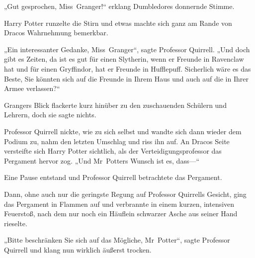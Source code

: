 „Gut gesprochen, Miss~Granger!“ erklang Dumbledores donnernde Stimme.

Harry Potter runzelte die Stirn und etwas machte sich ganz am Rande von Dracos Wahrnehmung bemerkbar.

„Ein interessanter Gedanke, Miss~Granger“, sagte Professor Quirrell. „Und doch gibt es Zeiten, da ist es gut für einen Slytherin, wenn er Freunde in Ravenclaw hat und für einen Gryffindor, hat er Freunde in Hufflepuff. Sicherlich wäre es das Beste, Sie könnten sich auf die Freunde in Ihrem Haus und auch auf die in Ihrer Armee verlassen?“

Grangers Blick flackerte kurz hinüber zu den zuschauenden Schülern und Lehrern, doch sie sagte nichts.

Professor Quirrell nickte, wie zu sich selbst und wandte sich dann wieder dem Podium zu, nahm den letzten Umschlag und riss ihn auf. An Dracos Seite versteifte sich Harry Potter sichtlich, als der Verteidigungsprofessor das Pergament hervor zog. „Und Mr~Potters Wunsch ist es, dass—“

Eine Pause entstand und Professor Quirrell betrachtete das Pergament.

Dann, ohne auch nur die geringste Regung auf Professor Quirrells Gesicht, ging das Pergament in Flammen auf und verbrannte in einem kurzen, intensiven Feuerstoß, nach dem nur noch ein Häuflein schwarzer Asche aus seiner Hand rieselte.

„Bitte beschränken Sie sich auf das Mögliche, Mr~Potter“, sagte Professor Quirrell und klang nun wirklich äußerst trocken.

